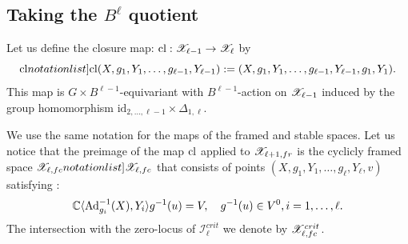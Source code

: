 






\subsection{Taking the $B^\ell$ quotient}

Let us define the closure map: $\mathrm{cl}: \mathscr{X}_{\ell-1}\rightarrow \mathscr{X}_\ell$ by
$$ \SymbolPrint{\cl}(X,g_1,Y_1,\dots,g_{\ell-1},Y_{\ell-1}):=(X,g_1,Y_1,\dots,g_{\ell-1},Y_{\ell-1},g_1,Y_1).$$
This map is $G\times B^{\ell-1}$-equivariant with $B^{\ell-1}$-action on $\mathscr{X}_{\ell-1}$ induced by
the group homomorphism $\mathrm{id}_{2,\dots,\ell-1}\times \Delta_{1,\ell}$.

We use the same notation
for the maps of the framed and stable spaces. Let us notice that  the preimage  of the map $\mathrm{cl}$ applied to $\mathscr{X}_{\ell+1,fr}$ is the cyclicly framed space \(\SymbolPrint{\calX_{\ell,fc}}\) that consists of points  \((X,g_1,Y_1,\dots,g_\ell,Y_\ell,v)\) satisfying 
:
$$ \mathbb{C}\langle{\rm Ad}_{g_i}^{-1}(X),Y_i\rangle g^{-1}(u)=V,\quad  g^{-1}(u)\in V^0, i=1,\dots,\ell.$$
The intersection with the zero-locus of $\mathcal{I}^{crit}_\ell$ we denote by $\mathscr{X}_{\ell,fc}^{crit}$.

